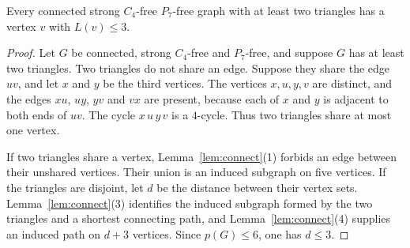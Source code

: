 \documentclass[ASNA]{USG}
\theoremstyle{WBstyletwo}
\numberwithin{equation}{section}
\newcommand{\pp}{p}
\begin{document}
\begin{lemma}\label{lem:twotri}
Every connected strong $C_4$-free $P_7$-free graph with at least two triangles has a vertex $v$ with $L(v)\le 3$.
\end{lemma}

\begin{proof}
Let $G$ be connected, strong $C_4$-free and $P_7$-free, and suppose $G$ has at least two triangles. Two triangles do not share an edge. Suppose they share the edge $uv$, and let $x$ and $y$ be the third vertices. The vertices $x,u,y,v$ are distinct, and the edges $xu$, $uy$, $yv$ and $vx$ are present, because each of $x$ and $y$ is adjacent to both ends of $uv$. The cycle $x\,u\,y\,v$ is a $4$-cycle. Thus two triangles share at most one vertex.

If two triangles share a vertex, Lemma~\ref{lem:connect}(1) forbids an edge between their unshared vertices. Their union is an induced subgraph on five vertices. If the triangles are disjoint, let $d$ be the distance between their vertex sets. Lemma~\ref{lem:connect}(3) identifies the induced subgraph formed by the two triangles and a shortest connecting path, and Lemma~\ref{lem:connect}(4) supplies an induced path on $d+3$ vertices. Since $\pp(G)\le 6$, one has $d\le 3$.


\end{proof}
\end{document}
